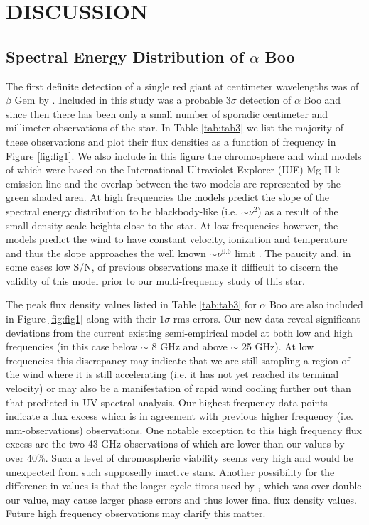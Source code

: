 \documentclass[iop]{emulateapj}
\begin{document}
\section{DISCUSSION}
\subsection{Spectral Energy Distribution of $\alpha$ Boo} \label{disc1}
The first definite detection of a single red giant at centimeter wavelengths was of $\beta$ Gem by \cite{1983ApJ...274L..77D}. Included in this study was a probable $3\sigma$ detection of $\alpha$ Boo and since then there has been only a small number of sporadic centimeter and millimeter observations of the star. In Table \ref{tab:tab3} we list the majority of these observations and plot their flux densities as a function of frequency in Figure \ref{fig:fig1}. We also include in this figure the chromosphere and wind models of \cite{1985pssl.proc..351D} which were based on the International Ultraviolet Explorer (IUE) Mg II k emission line and the overlap between the two models are represented by the green shaded area. At high frequencies the models predict the slope of the spectral energy distribution to be blackbody-like (i.e. $\sim \nu ^{2}$) as a result of the small density scale heights close to the star. At low frequencies however, the models predict the wind to have constant velocity, ionization and temperature and thus the slope  approaches the well known $\sim \nu ^{0.6}$ limit \citep{1975MNRAS.170...41W,1975AA....39..217O,1975AA....39....1P}. The paucity and, in some cases low S/N, of previous observations make it difficult to discern the validity of this model prior to our multi-frequency study of this star.

The peak flux density values listed in Table \ref{tab:tab3} for $\alpha$ Boo are also included in Figure \ref{fig:fig1} along with their $1\sigma$ rms errors. Our new data reveal significant deviations from the current existing semi-empirical model at both low and high frequencies (in this case below $\sim$ 8 GHz and above $\sim$ 25 GHz). At low frequencies this discrepancy may indicate that we are still sampling a region of the wind where it is still accelerating (i.e. it has not yet reached its terminal velocity) or may also be a manifestation of rapid wind cooling further out than that predicted in UV spectral analysis. Our highest frequency data points indicate a flux excess which is in agreement with previous higher frequency (i.e. mm-observations) observations. One notable exception to this high frequency flux excess are the two 43 GHz observations of \cite{2011AA...533A.107D} which are lower than our values by over 40\%. Such a level of chromospheric viability seems very high and would be unexpected from such supposedly inactive stars. Another possibility for the difference in values  is that the longer cycle times used by \cite{2011AA...533A.107D}, which was over double our value, may cause larger phase errors and thus lower final flux density values. Future high frequency observations may clarify this matter.
\end{document}
